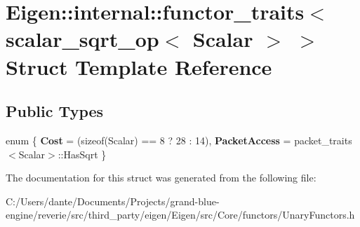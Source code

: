 \hypertarget{struct_eigen_1_1internal_1_1functor__traits_3_01scalar__sqrt__op_3_01_scalar_01_4_01_4}{}\section{Eigen\+::internal\+::functor\+\_\+traits$<$ scalar\+\_\+sqrt\+\_\+op$<$ Scalar $>$ $>$ Struct Template Reference}
\label{struct_eigen_1_1internal_1_1functor__traits_3_01scalar__sqrt__op_3_01_scalar_01_4_01_4}
\subsection*{Public Types}
\begin{DoxyCompactItemize}
\item 
\mbox{\label{struct_eigen_1_1internal_1_1functor__traits_3_01scalar__sqrt__op_3_01_scalar_01_4_01_4_a184d962550c327396ddd91d9ddfb13e0}} 
enum \{ {\bfseries Cost} = (sizeof(Scalar) == 8 ? 28 \+: 14), 
{\bfseries Packet\+Access} = packet\+\_\+traits$<$Scalar$>$\+::Has\+Sqrt
 \}
\end{DoxyCompactItemize}


The documentation for this struct was generated from the following file\+:\begin{DoxyCompactItemize}
\item 
C\+:/\+Users/dante/\+Documents/\+Projects/grand-\/blue-\/engine/reverie/src/third\+\_\+party/eigen/\+Eigen/src/\+Core/functors/Unary\+Functors.\+h\end{DoxyCompactItemize}
